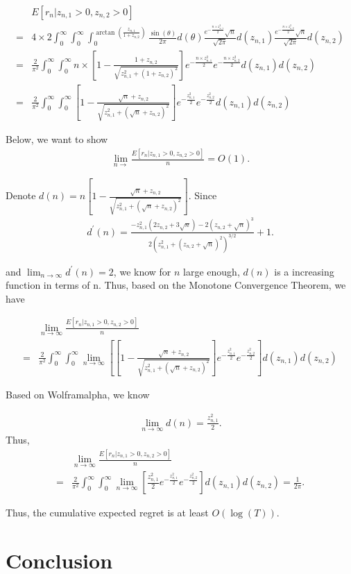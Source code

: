 \documentclass{article}
\begin{document}
\begin{align}
&E[r_n| z_{n,1}>0, z_{n,2}>0] \nonumber \\
=& 4\times 2 \int_{0}^{\infty} \int_{0}^{\infty} \int_{0}^{\arctan(\frac{z_{n,1}}{1+z_{n,2}})}\frac{\sin(\theta)}{2\pi}d(\theta)\frac{e^{-\frac{n \times z_{n,1}^2}{2}}\sqrt{n}}{\sqrt{2\pi}}d(z_{n,1})\frac{e^{-\frac{n \times z_{n,2}^2}{2}}\sqrt{n}}{\sqrt{2\pi}}d(z_{n,2}) \nonumber \\
=& \frac{2}{\pi^2}\int_{0}^{\infty} \int_{0}^{\infty}n\times [1-\frac{1+z_{n,2}}{\sqrt{z_{n,1}^2+(1+z_{n,2})^2}}]e^{-\frac{n \times z_{n,1}^2}{2}}e^{-\frac{n \times z_{n,2}^2}{2}}d(z_{n,1})d(z_{n,2}) \nonumber \\
=& \frac{2}{\pi^2}\int_{0}^{\infty} \int_{0}^{\infty} \left[1-\frac{\sqrt{n}+z_{n,2}}{\sqrt{z_{n,1}^2+(\sqrt{n}+z_{n,2})^2}}\right]e^{-\frac{z_{n,1}^2}{2}}e^{-\frac{z_{n,2}^2}{2}}d(z_{n,1})d(z_{n,2}) \nonumber 
\end{align}

Below, we want to show 
\begin{align}
\lim_{n\rightarrow}\frac{E[r_n| z_{n,1}>0, z_{n,2}>0]}{n} = O(1). \nonumber
\end{align}

Denote $d(n)=n\left[1-\frac{\sqrt{n}+z_{n,2}}{\sqrt{z_{n,1}^2+(\sqrt{n}+z_{n,2})^2}}\right]$.
Since
\begin{align}
d^{'}(n)=\frac{-z_{n,1}^2(2z_{n,2}+3\sqrt{n})-2(z_{n,2}+\sqrt{n})^3}{2(z_{n,1}^2+(z_{n,2}+\sqrt{n})^2)^{3/2}}+1. \nonumber
\end{align}

and $\lim_{n\rightarrow \infty}d^{'}(n)=2$, we know for $n$ large enough, $d(n)$ is a increasing function in terms of n. Thus, based on the Monotone Convergence Theorem, we have

\begin{align}
&\lim_{n\rightarrow \infty}\frac{E[r_n| z_{n,1}>0, z_{n,2}>0]}{n} \nonumber \\
=& \frac{2}{\pi^2}\int_{0}^{\infty} \int_{0}^{\infty}\lim_{n\rightarrow \infty}\left[ \left[1-\frac{\sqrt{n}+z_{n,2}}{\sqrt{z_{n,1}^2+(\sqrt{n}+z_{n,2})^2}}\right]e^{-\frac{z_{n,1}^2}{2}}e^{-\frac{z_{n,2}^2}{2}}\right]d(z_{n,1})d(z_{n,2}) \nonumber  
\end{align}


Based on Wolframalpha, we know

\begin{align}
\lim_{n\rightarrow \infty} d(n)=\frac{z_{n,1}^2}{2}. \nonumber
\end{align}
Thus,
\begin{align}
&\lim_{n\rightarrow \infty}\frac{E[r_n| z_{n,1}>0, z_{n,2}>0]}{n} \nonumber \\
=&\frac{2}{\pi^2}\int_{0}^{\infty} \int_{0}^{\infty}\lim_{n\rightarrow \infty}\left[ \frac{z_{n,1}^2}{2}e^{-\frac{z_{n,1}^2}{2}}e^{-\frac{z_{n,2}^2}{2}}\right]d(z_{n,1})d(z_{n,2}) = \frac{1}{2\pi}. \nonumber
\end{align}


Thus, the cumulative expected regret is at least $O(\log(T))$.


\section{Conclusion}


{}

\end{document}
